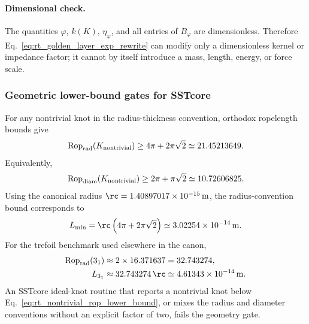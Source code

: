 \paragraph{Dimensional check.}
The quantities \(\varphi\), \(k(K)\), \(\eta_\varphi\), and all entries of
\(B_\varphi\) are dimensionless.  Therefore
Eq.~\eqref{eq:rt_golden_layer_exp_rewrite} can modify only a dimensionless
kernel or impedance factor; it cannot by itself introduce a mass, length,
energy, or force scale.

\subsubsection{Geometric lower-bound gates for SSTcore}
For any nontrivial knot in the radius-thickness convention, orthodox
ropelength bounds give
\begin{align}
    \operatorname{Rop}_{\rm rad}(K_{\rm nontrivial})
    \ge
    4\pi+2\pi\sqrt2
    \simeq 21.45213649 .
    \label{eq:rt_nontrivial_rop_lower_bound}
\end{align}
Equivalently,
\begin{align}
    \operatorname{Rop}_{\rm diam}(K_{\rm nontrivial})
    \ge
    2\pi+\pi\sqrt2
    \simeq 10.72606825 .
    \label{eq:rt_nontrivial_rop_diam_bound}
\end{align}
Using the canonical radius $\rc=1.40897017\times10^{-15}\,\mathrm{m}$, the
radius-convention bound corresponds to
\begin{align}
    L_{\min}
    =
    \rc\left(4\pi+2\pi\sqrt2\right)
    \simeq
    3.02254\times10^{-14}\,\mathrm{m} .
    \label{eq:rt_nontrivial_physical_length_bound}
\end{align}
For the trefoil benchmark used elsewhere in the canon,
\begin{align}
    \operatorname{Rop}_{\rm rad}(3_1)
    &\approx 2\times16.371637=32.743274,\\
    L_{3_1}
    &\approx
    32.743274\,\rc
    \simeq
    4.61343\times10^{-14}\,\mathrm{m} .
    \label{eq:rt_trefoil_physical_length_benchmark}
\end{align}
An SSTcore ideal-knot routine that reports a nontrivial knot below
Eq.~\eqref{eq:rt_nontrivial_rop_lower_bound}, or mixes the radius and diameter
conventions without an explicit factor of two, fails the geometry gate.

